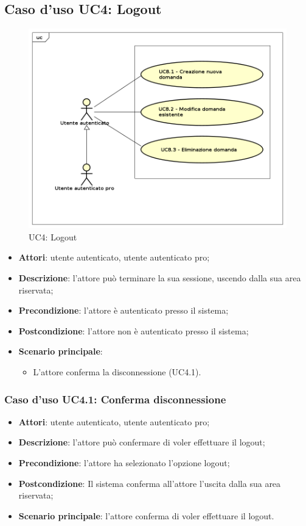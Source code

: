 \newpage
\subsection{Caso d'uso UC4: Logout}
	\label{UC4}
	\begin{figure}[h]
		\centering
			\includegraphics[scale=0.5,keepaspectratio]{UML/UC4.png}
		\caption{UC4: Logout}
	\end{figure}
	\FloatBarrier
	\begin{itemize}
		\item
			\textbf{Attori}: utente autenticato, utente autenticato pro;
		\item		
			\textbf{Descrizione}: l'attore può terminare la sua sessione, uscendo dalla sua area riservata;
		\item
			\textbf{Precondizione}: l'attore è autenticato presso il sistema;
		\item
			\textbf{Postcondizione}: l'attore non è autenticato presso il sistema;
		\item
			\textbf{Scenario principale}:
	       		\begin{itemize}
					\item
					L'attore conferma la disconnessione (UC4.1).
	 			\end{itemize}
	\end{itemize}

\subsubsection{Caso d'uso UC4.1: Conferma disconnessione}
	\begin{itemize}
		\item
			\textbf{Attori}: utente autenticato, utente autenticato pro;
		\item
			\textbf{Descrizione}: l'attore può confermare di voler effettuare il logout;
 		\item
			\textbf{Precondizione}: l'attore ha selezionato l'opzione logout;
		\item
			\textbf{Postcondizione}: Il sistema conferma all'attore l'uscita dalla sua area riservata;
		\item
			\textbf{Scenario principale}: l'attore conferma di voler effettuare il logout.
	\end{itemize}		
	